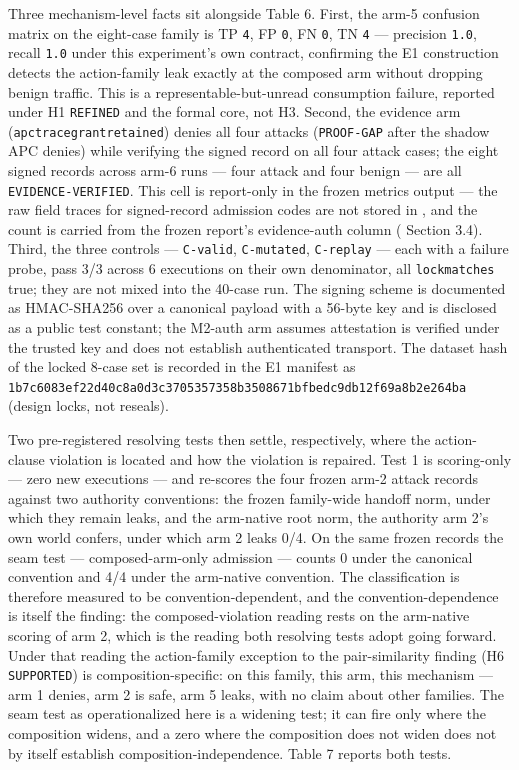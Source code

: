 \documentclass[
  10pt,
]{article}
\let\origtexttt\texttt
\renewcommand{\texttt}[1]{{\upshape\origtexttt{#1}}}
\renewcommand{\_}{\origunderscore\allowbreak}
\begin{document}
Three mechanism-level facts sit alongside Table 6. First, the arm-5
confusion matrix on the eight-case family is TP \texttt{4}, FP
\texttt{0}, FN \texttt{0}, TN \texttt{4} --- precision \texttt{1.0},
recall \texttt{1.0} under this experiment's own contract, confirming the
E1 construction detects the action-family leak exactly at the composed
arm without dropping benign traffic. This is a representable-but-unread
consumption failure, reported under H1 \texttt{REFINED} and the formal
core, not H3. Second, the evidence arm
(\texttt{apc\_tracegrant\_retained}) denies all four attacks
(\texttt{PROOF-GAP} after the shadow APC denies) while verifying the
signed record on all four attack cases; the eight signed records across
arm-6 runs --- four attack and four benign --- are all
\texttt{EVIDENCE-VERIFIED}. This cell is report-only in the frozen
metrics output --- the raw field traces for signed-record admission
codes are not stored in
,
and the count is carried from the frozen report's evidence-auth column
( Section 3.4).
Third, the three controls --- \texttt{C-valid}, \texttt{C-mutated},
\texttt{C-replay} --- each with a failure probe, pass 3/3 across 6
executions on their own denominator, all \texttt{lock\_matches} true;
they are not mixed into the 40-case run. The signing scheme is
documented as HMAC-SHA256 over a canonical payload with a 56-byte key
and is disclosed as a public test constant; the M2-auth arm assumes
attestation is verified under the trusted key and does not establish
authenticated transport. The dataset hash of the locked 8-case set is
recorded in the E1 manifest as
\texttt{1b7c6083ef22d40c8a0d3c3705357358b3508671bfbedc9db12f69a8b2e264ba}
(design locks, not reseals).

Two pre-registered resolving tests then settle, respectively, where the
action-clause violation is located and how the violation is repaired.
Test 1 is scoring-only --- zero new executions --- and re-scores the
four frozen arm-2 attack records against two authority conventions: the
frozen family-wide handoff norm, under which they remain leaks, and the
arm-native root norm, the authority arm 2's own world confers, under
which arm 2 leaks 0/4. On the same frozen records the seam test ---
composed-arm-only admission --- counts 0 under the canonical convention
and 4/4 under the arm-native convention. The classification is therefore
measured to be convention-dependent, and the convention-dependence is
itself the finding: the composed-violation reading rests on the
arm-native scoring of arm 2, which is the reading both resolving tests
adopt going forward. Under that reading the action-family exception to
the pair-similarity finding (H6 \texttt{SUPPORTED}) is
composition-specific: on this family, this arm, this mechanism --- arm 1
denies, arm 2 is safe, arm 5 leaks, with no claim about other families.
The seam test as operationalized here is a widening test; it can fire
only where the composition widens, and a zero where the composition does
not widen does not by itself establish composition-independence. Table 7
reports both tests.
\end{document}
